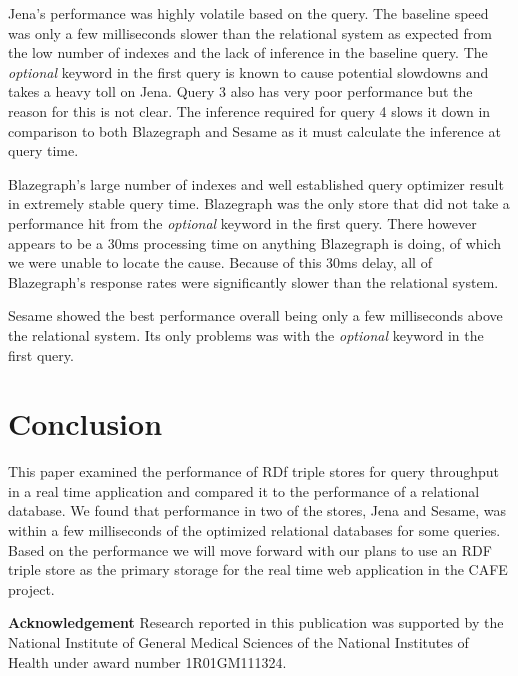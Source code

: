 \documentclass{llncs}
\begin{document}
Jena's performance was highly volatile based on the query.  The baseline speed was only a few milliseconds slower than the relational system as expected from the low number of indexes and the lack of inference in the baseline query.  The \emph{optional} keyword in the first query is known to cause potential slowdowns and takes a heavy toll on Jena.  Query 3 also has very poor performance but the reason for this is not clear.  The inference required for query 4 slows it down in comparison to both Blazegraph and Sesame as it must calculate the inference at query time.

Blazegraph's large number of indexes and well established query optimizer result in extremely stable query time.  Blazegraph was the only store that did not take a performance hit from the \emph{optional} keyword in the first query.  There however appears to be a 30ms processing time on anything Blazegraph is doing, of which we were unable to locate the cause.  Because of this 30ms delay, all of Blazegraph's response rates were significantly slower than the relational system.

Sesame showed the best performance overall being only a few milliseconds above the relational system.  Its only problems was with the \emph{optional} keyword in the first query.

\section{Conclusion}
This paper examined the performance of RDf triple stores for query throughput in a real time application and compared it to the performance of a relational database.  We found that performance in two of the stores, Jena and Sesame, was within a few milliseconds of the optimized relational databases for some queries.  Based on the performance we will move forward with our plans to use an RDF triple store as the primary storage for the real time web application in the CAFE project.

\medskip
\noindent
\textbf{Acknowledgement} Research reported in this publication was supported by the National Institute of General Medical Sciences of the National Institutes of Health under award number 1R01GM111324.



\end{document}
